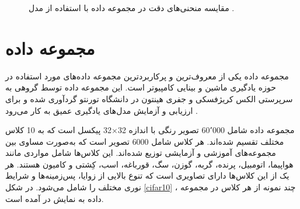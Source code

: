 \begin{figure}[b]
	\centering
	\hspace{0.8mm}
	\caption{
		مقایسه منحنی‌های دقت در مجموعه داده
		با استفاده از مدل
		.
	}
	\label{result_mnist_cnn}
\end{figure}





\section{
	مجموعه داده
}


مجموعه داده
یکی از معروف‌ترین و پرکاربردترین مجموعه داده‌های مورد استفاده در حوزه یادگیری ماشین و بینایی کامپیوتر است. این مجموعه داده توسط گروهی به سرپرستی الکس کریژفسکی%
و جفری هینتون%
در دانشگاه تورنتو گردآوری شده و برای ارزیابی و آزمایش مدل‌های یادگیری عمیق به کار می‌رود
\cite{krizhevsky2009learning}.


مجموعه داده
شامل 60٬000 تصویر رنگی با اندازه
32$\times$32
پیکسل است که به 10 کلاس مختلف تقسیم شده‌اند. هر کلاس شامل 6000 تصویر است که به‌صورت مساوی بین مجموعه‌های آموزشی و آزمایشی توزیع شده‌اند. این کلاس‌ها شامل مواردی مانند هواپیما، اتومبیل، پرنده، گربه، گوزن، سگ، قورباغه، اسب، کِشتی و کامیون هستند. هر یک از این کلاس‌ها دارای تصاویری است که تنوع بالایی از زوایا، پس‌زمینه‌ها و شرایط نوری مختلف را شامل می‌شود.
در شکل
\ref{cifar10}%
، چند نمونه از هر کلاس در مجموعه داده
\mbox{}
به نمایش در آمده است.


